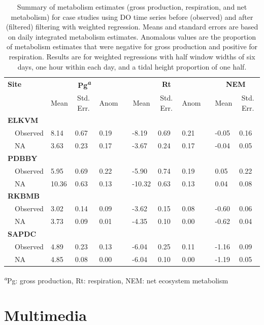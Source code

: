 \documentclass[letterpaper,12pt,oneside]{article}\usepackage[]{graphicx}\usepackage[]{color}
\begin{document}
%
\begin{table}[!tbp]
\caption{Summary of metabolism estimates (gross production, respiration, and net metabolism) for case studies using \ac{DO} time series before (observed) and after (filtered) filtering with weighted regression.  Means and standard errors are based on daily integrated metabolism estimates.  Anomalous values are the proportion of metabolism estimates that were negative for gross production and positive for respiration.  Results are for weighted regressions with half window widths of six days, one hour within each day, and a tidal height proportion of one half.\label{tab:case_res}} 
\begin{center}
\begin{tabular}{llllclllcll}
\hline\hline
\multicolumn{1}{l}{\bfseries Site}&\multicolumn{3}{c}{\bfseries Pg\textsuperscript{\textit{a}}}&\multicolumn{1}{c}{\bfseries }&\multicolumn{3}{c}{\bfseries Rt}&\multicolumn{1}{c}{\bfseries }&\multicolumn{2}{c}{\bfseries NEM}\tabularnewline
\cline{2-4} \cline{6-8} \cline{10-11}
\multicolumn{1}{l}{}&\multicolumn{1}{c}{Mean}&\multicolumn{1}{c}{Std. Err.}&\multicolumn{1}{c}{Anom}&\multicolumn{1}{c}{}&\multicolumn{1}{c}{Mean}&\multicolumn{1}{c}{Std. Err.}&\multicolumn{1}{c}{Anom}&\multicolumn{1}{c}{}&\multicolumn{1}{c}{Mean}&\multicolumn{1}{c}{Std. Err.}\tabularnewline
\hline
{\bfseries ELKVM}&&&&&&&&&&\tabularnewline
~~Observed& 8.14&0.67&0.19&& -8.19&0.69&0.21&&-0.05&0.16\tabularnewline
~~NA& 3.63&0.23&0.17&& -3.67&0.24&0.17&&-0.04&0.05\tabularnewline
\hline
{\bfseries PDBBY}&&&&&&&&&&\tabularnewline
~~Observed& 5.95&0.69&0.22&& -5.90&0.74&0.19&& 0.05&0.22\tabularnewline
~~NA&10.36&0.63&0.13&&-10.32&0.63&0.13&& 0.04&0.08\tabularnewline
\hline
{\bfseries RKBMB}&&&&&&&&&&\tabularnewline
~~Observed& 3.02&0.14&0.09&& -3.62&0.15&0.08&&-0.60&0.06\tabularnewline
~~NA& 3.73&0.09&0.01&& -4.35&0.10&0.00&&-0.62&0.04\tabularnewline
\hline
{\bfseries SAPDC}&&&&&&&&&&\tabularnewline
~~Observed& 4.89&0.23&0.13&& -6.04&0.25&0.11&&-1.16&0.09\tabularnewline
~~NA& 4.85&0.08&0.00&& -6.04&0.10&0.00&&-1.19&0.05\tabularnewline
\hline
\end{tabular}
\end{center}
\textsuperscript{\textit{a}}Pg: gross production, Rt: respiration, NEM: net ecosystem metabolism\end{table}


\clearpage


\raggedbottom
\raggedright
\setlength{\parindent}{0.5in}

\section{Multimedia} \label{multi}

\end{document}
